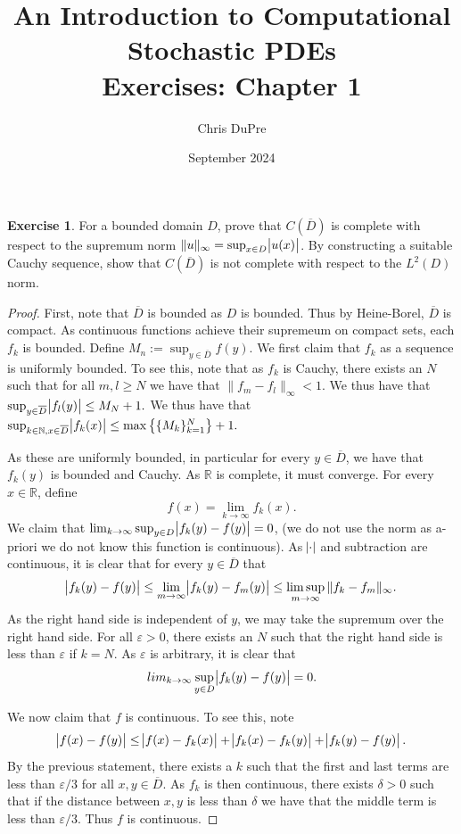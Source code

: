 \documentclass{amsart}
\title{An Introduction to Computational Stochastic PDEs\\ Exercises: Chapter 1}
\author{Chris DuPre }
\date{September 2024}
\theoremstyle{plain}
\theoremstyle{definition}
\newtheorem{exer}{Exercise}[section]
\newcommand{\R}{\mathbb{R}}
\newcommand{\N}{\mathbb{N}}
\begin{document}
\maketitle
\setcounter{section}{1}
\begin{exer}
For a bounded domain $D$, prove that $C\left(\overline{D}\right)$ is complete with respect to the supremum
norm $\|u\|_{\infty} = \sup_{x \in D} \abs{u(x)}$. By constructing a suitable Cauchy sequence, show that
$C\left(\overline{D}\right)$ is not complete with respect to the $L^{2}(D)$ norm. 
\end{exer}
\begin{proof}
    First, note that $\overline{D}$ is bounded as $D$ is bounded. Thus by Heine-Borel, $\overline{D}$ is compact. As continuous functions achieve their supremeum on compact sets, each $f_k$ is bounded. Define $M_n := \sup_{y\in \overline{D}} f(y)$. We first claim that $f_k$ as a sequence is uniformly bounded. To see this, note that as $f_k$ is Cauchy, there exists an $N$ such that for all $m,l\geq N$ we have that $\|f_m-f_l\|_{\infty} < 1.$ We thus have that $\sup_{y\in \overline{D}} \abs{f_l(y)} \leq M_N + 1.$ We thus have that $\sup_{k\in \N, x\in \overline{D}}\abs{f_k(x)} \leq \max\left\{\{M_k\}_{k=1}^{N}\right\}+1.$
    \par 
    As these are uniformly bounded, in particular for every $y\in \overline{D}$, we have that $f_k(y)$ is bounded and Cauchy. As $\R$ is complete, it must converge. For every $x\in \R$, define
    $$f(x) = \lim_{k\to \infty} f_k(x).$$
    We claim that $\lim_{k\to \infty} \sup_{y\in D} \abs{f_k(y)-f(y)} = 0$, (we do not use the norm as a-priori we do not know this function is continuous). As $\abs{\cdot}$ and subtraction are continuous, it is clear that for every $y \in \overline{D}$ that
    $$\abs{f_{k}(y)-f(y)} \leq\lim_{m\to \infty}\abs{f_{k}(y)-f_{m}(y)} \leq \limsup_{m\to \infty} \|f_k -f_m\|_{\infty}.$$
    As the right hand side is independent of $y$, we may take the supremum over the right hand side. For all $\varepsilon > 0$, there exists an $N$ such that the right hand side is less than $\varepsilon$ if $k=N$. As $\varepsilon$ is arbitrary, it is clear that 
    $$lim_{k\to \infty} \sup_{y\in D} \abs{f_k(y)-f(y)} = 0.$$
    \par We now claim that $f$ is continuous. To see this, note
    $$\abs{f(x)-f(y)}\leq \abs{f(x)-f_k(x)}+\abs{f_k(x)-f_k(y)}+\abs{f_k(y)-f(y)}.$$
    By the previous statement, there exists a $k$ such that the first and last terms are less than $\varepsilon/3$ for all $x,y\in\overline{D}.$ As $f_k$ is then continuous, there exists $\delta > 0$ such that if the distance between $x,y$ is less than $\delta$ we have that the middle term is less than $\varepsilon/3$. Thus $f$ is continuous.

\end{proof}
\end{document}
